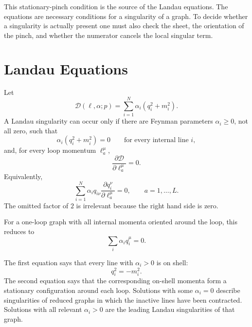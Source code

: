 \begin{center}
\end{center}

This stationary-pinch condition is the source of the Landau equations.  The
equations are necessary conditions for a singularity of a graph.  To decide
whether a singularity is actually present one must also check the sheet, the
orientation of the pinch, and whether the numerator cancels the local
singular term.

\section{Landau Equations}

Let
\[
  \mathcal D(\ell,\alpha;p)
  =
  \sum_{i=1}^N\alpha_i(q_i^2+m_i^2).
\]
A Landau singularity can occur only if there are Feynman parameters
\(\alpha_i\ge0\), not all zero, such that
\[
  \alpha_i(q_i^2+m_i^2)=0
  \qquad\text{for every internal line }i,
\]
and, for every loop momentum \(\ell_a^\mu\),
\[
  \frac{\partial\mathcal D}{\partial \ell_a^\mu}=0.
\]
Equivalently,
\[
  \sum_{i=1}^N
  \alpha_i q_{i\nu}
  \frac{\partial q_i^\nu}{\partial \ell_a^\mu}
  =
  0,
  \qquad a=1,\ldots,L .
\]
The omitted factor of \(2\) is irrelevant because the right hand side is
zero.

For a one-loop graph with all internal momenta oriented around the loop, this
reduces to
\[
  \sum_i\alpha_i q_i^\mu=0 .
\]

The first equation says that every line with \(\alpha_i>0\) is on shell:
\[
  q_i^2=-m_i^2 .
\]
The second equation says that the corresponding on-shell momenta form a
stationary configuration around each loop.  Solutions with some
\(\alpha_i=0\) describe singularities of reduced graphs in which the inactive
lines have been contracted.  Solutions with all relevant \(\alpha_i>0\) are
the leading Landau singularities of that graph.

